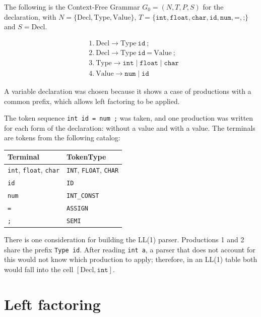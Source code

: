 \documentclass[12pt,letterpaper]{article}
\newcommand{\cd}[1]{\texttt{#1}}                       %
\begin{document}
The following is the Context-Free Grammar $G_0 = (N, T, P, S)$ for the declaration, with $N = \{\text{Decl}, \text{Type}, \text{Value}\}$, $T = \{\texttt{int}, \texttt{float}, \texttt{char}, \texttt{id}, \texttt{num}, \texttt{=}, \texttt{;}\}$ and $S = \text{Decl}$.

\begin{align*}
&1.\ \text{Decl} \rightarrow \text{Type}\ \texttt{id}\ \texttt{;} \\
&2.\ \text{Decl} \rightarrow \text{Type}\ \texttt{id}\ \texttt{=}\ \text{Value}\ \texttt{;} \\
&3.\ \text{Type} \rightarrow \texttt{int} \mid \texttt{float} \mid \texttt{char} \\
&4.\ \text{Value} \rightarrow \texttt{num} \mid \texttt{id}
\end{align*}

A variable declaration was chosen because it shows a case of productions with a common prefix, which allows left factoring to be applied.

The token sequence \cd{int id = num ;} was taken, and one production was written for each form of the declaration: without a value and with a value. The terminals are tokens from the following catalog:

\begin{center}
\small
\begin{tabular}{@{}l l@{}}
\toprule
\textbf{Terminal} & \textbf{TokenType} \\
\midrule
\cd{int}, \cd{float}, \cd{char} & \cd{INT}, \cd{FLOAT}, \cd{CHAR} \\
\cd{id}  & \cd{ID} \\
\cd{num} & \cd{INT\_CONST} \\
\cd{=}   & \cd{ASSIGN} \\
\cd{;}   & \cd{SEMI} \\
\bottomrule
\end{tabular}
\end{center}

There is one consideration for building the LL(1) parser. Productions 1 and 2 share the prefix \cd{Type id}. After reading \cd{int a}, a parser that does not account for this would not know which production to apply; therefore, in an LL(1) table both would fall into the cell $[\text{Decl}, \texttt{int}]$.


\section{Left factoring}
\end{document}
